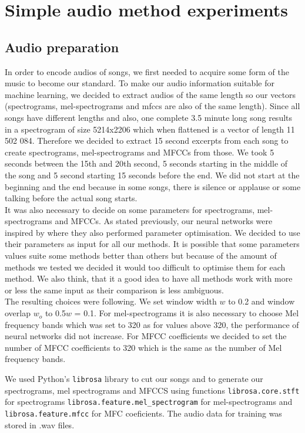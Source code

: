 \section{Simple audio method experiments}
\subsection{Audio preparation}\label{ssec:audio_prep}

In order to encode audios of songs, we first needed to acquire some form of the music to become our standard. To make our audio information suitable for machine learning, we decided to extract audios of the same length so our vectors (spectrograms, mel-spectrograms and mfccs are also of the same length). Since all songs have different lengths and also, one complete 3.5 minute long song results in a spectrogram of size 5214x2206 which when flattened is a vector of length 11 502 084. Therefore we decided to extract 15 second excerpts from each song to create spectrograms, mel-spectrograms and MFCCs from those. We took 5 seconds between the 15th and 20th second, 5 seconds starting in the middle of the song and 5 second starting 15 seconds before the end. We did not start at the beginning and the end because in some songs, there is silence or applause or some talking before the actual song starts. \\

It was also necessary to decide on some parameters for spectrograms, mel-spectrograms and MFCCs. As stated previously, our neural networks were inspired by \cite{inproceedings_RNNs} where they also performed parameter optimisation. We decided to use their parameters as input for all our methods. It is possible that some parameters values suite some methods better than others but because of the amount of methods we tested we decided it would too difficult to optimise them for each method. We also think, that it a good idea to have all methods work with more or less the same input as their comparison is less ambiguous. \\
The resulting choices were following. We set window width $w$ to 0.2 and window overlap $w_o$ to 0.5$w$ = 0.1. For mel-spectrograms it is also necessary to choose Mel frequency bands which was set to 320 as for values above 320, the performance of neural networks did not increase. For MFCC coefficients we decided to set the number of MFCC coefficients to 320 which is the same as the number of Mel frequency bands.

We used Python's \texttt{librosa} library \cite{brian_mcfee_2019_2564164} to cut our songs and to generate our spectrograms, mel spectrograms and MFCCS using functions \texttt{librosa.core.stft} for spectrograms \texttt{librosa.feature.mel\_spectrogram} for mel-spectrograms and \texttt{librosa.feature.mfcc} for MFC coeficients. The audio data for training was stored in .wav files.

